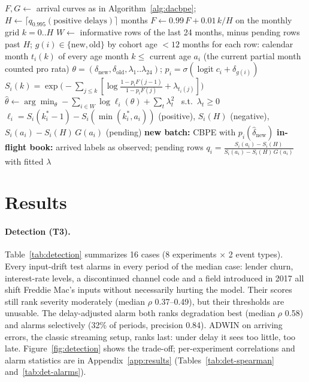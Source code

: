 \documentclass[11pt]{article}
\begin{document}
\begin{algorithm}[t]
\caption{Hazard variant (DA-CBPE-HZ) at decision time $s$}
\label{alg:hazard}
\begin{algorithmic}[1]
\State $F, G \gets$ arrival curves as in Algorithm~\ref{alg:dacbpe}; $H \gets \lceil q_{0.995}(\text{positive delays}) \rceil$ months
\State $F \gets 0.99\,F + 0.01\,k/H$ on the monthly grid $k = 0..H$ 
\State $W \gets$ informative rows of the last 24 months, minus pending rows past $H$; $g(i) \in \{\text{new}, \text{old}\}$ by cohort age $< 12$ months
\State for each row: calendar month $t_i(k)$ of every age month $k \le$ current age $a_i$ (the current partial month counted pro rata)
\State $\theta = (\delta_{\text{new}}, \delta_{\text{old}}, \lambda_1..\lambda_{24})$; \quad $p_i = \sigma(\operatorname{logit} c_i + \delta_{g(i)})$
\State $S_i(k) = \exp\!\big(-\sum_{j \le k} [\log\frac{1 - p_i F(j-1)}{1 - p_i F(j)} + \lambda_{t_i(j)}]\big)$
\State $\hat\theta \gets \arg\min_\theta -\sum_{i \in W} \log \ell_i(\theta) + \sum_t \lambda_t^2$ \ s.t.\ $\lambda_t \ge 0$ 
\Statex \hspace{\algorithmicindent} $\ell_i = S_i(k^*_i - 1) - S_i(\min(k^*_i, a_i))$ (positive), $S_i(H)$ (negative), $S_i(a_i) - S_i(H)\,G(a_i)$ (pending)
\State \textbf{new batch:} CBPE with $p_i(\hat\delta_{\text{new}})$ 
\State \textbf{in-flight book:} arrived labels as observed; pending rows $q_i = \frac{S_i(a_i) - S_i(H)}{S_i(a_i) - S_i(H)\,G(a_i)}$ with fitted $\lambda$
\end{algorithmic}
\end{algorithm}

\section{Results}\label{sec:results}

\paragraph{Detection (T3).} Table~\ref{tab:detection} summarizes 16 cases (8 experiments $\times$
2 event types). Every input-drift test alarms in every period of the median case: lender
churn, interest-rate levels, a discontinued channel code and a field introduced in 2017 all
shift Freddie Mac's inputs without necessarily hurting the model. Their scores still rank
severity moderately (median $\rho$ 0.37--0.49), but their thresholds are unusable. The
delay-adjusted alarm both ranks degradation best (median $\rho$ 0.58) and alarms selectively
(32\% of periods, precision 0.84). ADWIN on arriving errors, the classic streaming setup, ranks
last: under delay it sees too little, too late. Figure~\ref{fig:detection} shows the trade-off;
per-experiment correlations and alarm statistics are in Appendix~\ref{app:results}
(Tables~\ref{tab:det-spearman} and~\ref{tab:det-alarms}).
\end{document}
